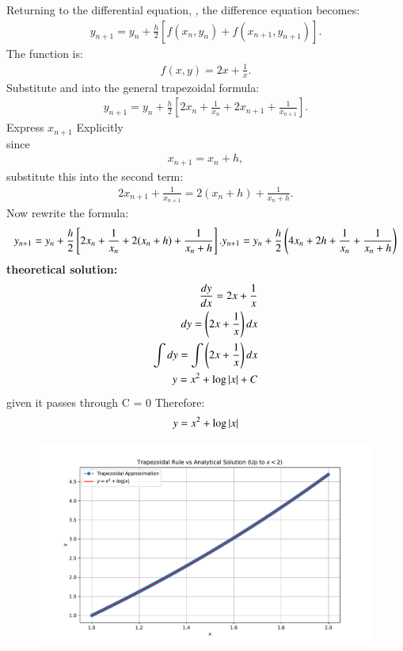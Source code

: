 \documentclass[journal]{IEEEtran}
\begin{document}
Returning to the differential equation, , the difference equation becomes:
\begin{align}
y_{n+1} = y_n + \frac{h}{2} \left[ f(x_n, y_n) + f(x_{n+1}, y_{n+1}) \right].
\end{align}
The function  is:
\begin{align}
f(x, y) =  2x + \frac{1}{x}.
\end{align}
Substitute  and  into the general trapezoidal formula:
\begin{align}
y_{n+1} = y_n + \frac{h}{2} \left[2x_n + \frac{1}{x_n} + 2x_{n+1} +\frac{1}{x_{n+1}} \right].
\end{align}
 Express $x_{n+1}$ Explicitly \\
 since 
 \begin{align}
     x_{n+1} = x_n + h,
 \end{align}
 substitute this into the second term: 
 \begin{align}
     2x_{n+1} + \frac{1}{x_{n+1}} = 2(x_n + h) + \frac{1}{x_n + h}.
 \end{align}
 Now rewrite the formula:
 \begin{align}
     y_{n+1} = y_n + \frac{h}{2} \left[2x_n +  \frac{1}{x_n} + 2(x_n + h) + \frac{1}{x_n + h} \right].
     y_{n+1} = y_n + \frac{h}{2} \left(4x_n + 2h + \frac{1}{x_n}+\frac{1}{x_n + h}\right)
 \end{align}
 \textbf{theoretical solution:}
 \begin{align}
    \frac{dy}{dx} = 2x + \frac{1}{x}\\
    dy = \left(2x+\frac{1}{x}\right)dx\\
    \int dy = \int\left(2x+\frac{1}{x}\right)dx\\
    y = x^2 + \log{\left\vert x\right\vert} + C
\end{align}
given it passes through  C = 0
Therefore: 
\begin{align}
    y = x^2 + \log{\left\vert x\right\vert}
\end{align}
 \begin{figure}[h!]
   \centering
   \includegraphics[width=\columnwidth]{figs/fig.pdf}
\end{figure}
\end{document}
